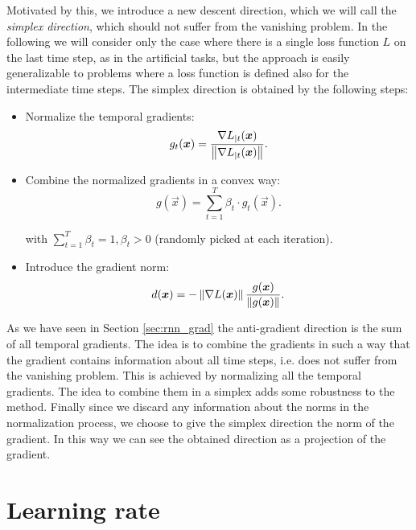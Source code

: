 Motivated by this, we introduce a new descent direction, which we will call the \textit{simplex direction},
which should not suffer from the vanishing problem. In the following we will consider only the case where there is a single loss function $L$ on the last time step, as in the artificial tasks, but the approach is easily generalizable to problems where a loss function is defined also for the intermediate time steps. The simplex direction is obtained by the following steps:


\begin{itemize}
	\item Normalize the temporal gradients:
	\begin{equation}
	g_t(\boldsymbol{x}) = \frac{\nabla L_{|t}(\boldsymbol{x})}{\left\Vert \nabla L_{|t}(\boldsymbol{x}) \right\Vert}.
	\end{equation}
	
	\item Combine the normalized gradients in a convex way:
	\begin{equation}
	g(\vec{x}) = \sum_{t=1}^T \beta_t \cdot g_t(\vec{x}).
	\end{equation}
	
	with $\sum_{t=1}^T\beta_t=1, \beta_t>0$ (randomly picked at each iteration).
	\item Introduce the gradient norm:
	\begin{equation}
	d(\boldsymbol{x}) = - \left\Vert \nabla L (\boldsymbol{x}) \right\Vert\frac{g(\boldsymbol{x})}{\left\Vert g(\boldsymbol{x}) \right\Vert}.
	\end{equation}
\end{itemize}

As we have seen in Section \ref{sec:rnn_grad} the anti-gradient direction is the sum of all temporal gradients. The idea is to combine the gradients in such a way that the gradient contains information about all time steps, i.e. does not suffer from the vanishing problem. This is achieved by normalizing all the temporal gradients. The idea to combine them in a simplex adds some robustness to the method. Finally since we discard any information about the norms in the normalization process, we choose to give the simplex direction the norm of the gradient. In this way we can see the obtained direction as a projection of the gradient.


\section{Learning rate}

